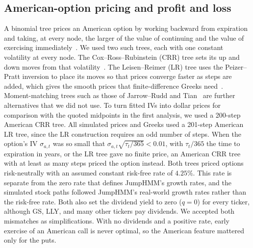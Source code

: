 \subsection{American-option pricing and profit and loss}

A binomial tree prices an American option by working backward from expiration and taking, at every node, the larger of the value of continuing and the value of exercising immediately~\cite{cox1979,broadie1996}. We used two such trees, each with one constant volatility at every node. The Cox--Ross--Rubinstein (CRR) tree sets its up and down moves from that volatility~\cite{cox1979}. The Leisen--Reimer (LR) tree uses the Peizer--Pratt inversion to place its moves so that prices converge faster as steps are added, which gives the smooth prices that finite-difference Greeks need~\cite{leisen1996}. Moment-matching trees such as those of Jarrow--Rudd and Tian~\cite{jarrow1983,tian1993} are further alternatives that we did not use. To turn fitted IVs into dollar prices for comparison with the quoted midpoints in the first analysis, we used a 200-step American CRR tree. All simulated prices and Greeks used a 201-step American LR tree, since the LR construction requires an odd number of steps. When the option's IV $\sigma_{a,t}$ was so small that $\sigma_{a,t}\sqrt{\tau_t/365}<0.01$, with $\tau_t/365$ the time to expiration in years, or the LR tree gave no finite price, an American CRR tree with at least as many steps priced the option instead. Both trees priced options risk-neutrally with an assumed constant risk-free rate of $4.25\%$. This rate is separate from the zero rate that defines JumpHMM's growth rates, and the simulated stock paths followed JumpHMM's real-world growth rates rather than the risk-free rate. Both also set the dividend yield to zero ($q=0$) for every ticker, although GS, LLY, and many other tickers pay dividends. We accepted both mismatches as simplifications. With no dividends and a positive rate, early exercise of an American call is never optimal, so the American feature mattered only for the puts.

